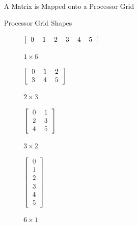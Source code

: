 \begin{frame}{A Matrix is Mapped onto a Processor Grid}
\begin{block}{Processor Grid Shapes}
\begin{table}[ht]
        \centering
      \begin{subfigure}[b]{0.23\textwidth}
        \centering
        $\left[\begin{tabular}{llllll}
            0 & 1 & 2 & 3 & 4 & 5
          \end{tabular}\right]$
        \vspace{1.5cm}
        \caption{$1\times 6$}
      \end{subfigure}%
      \begin{subfigure}[b]{0.23\textwidth}
        \centering
        $\left[\begin{tabular}{lll}
            0 & 1 & 2\\
            3 & 4 & 5
          \end{tabular}\right]$
        \caption{$2\times 3$}
      \end{subfigure}%
      \begin{subfigure}[b]{0.23\textwidth}
        \centering
        $\left[\begin{tabular}{ll}
            0 & 1 \\
            2 & 3\\
            4 & 5
          \end{tabular}\right]$
        \caption{$3\times 2$}
      \end{subfigure}
      \begin{subfigure}[b]{0.23\textwidth}
        \centering
        $\left[\begin{tabular}{l}
            0 \\ 1 \\ 2 \\ 3 \\ 4 \\ 5
          \end{tabular}\right]$
        \caption{$6\times 1$}
      \end{subfigure}
        \caption{Processor Grid Shapes with 6 Processors}\label{fig:gridshapes}
\end{table}
\end{block}
\end{frame}


